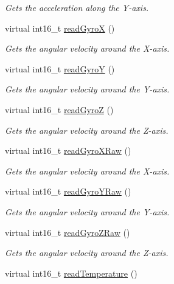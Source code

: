 \begin{DoxyCompactItemize}
\begin{DoxyCompactList}\small\item\em Gets the acceleration along the Y-\/axis. \end{DoxyCompactList}\item 
virtual int16\+\_\+t \hyperlink{classMpu6050_a9ec9443071ff4c69d08aa5aada80a1ad}{read\+GyroX} ()
\begin{DoxyCompactList}\small\item\em Gets the angular velocity around the X-\/axis. \end{DoxyCompactList}\item 
virtual int16\+\_\+t \hyperlink{classMpu6050_a32291036eb3c88455bc8054d5014d99c}{read\+GyroY} ()
\begin{DoxyCompactList}\small\item\em Gets the angular velocity around the Y-\/axis. \end{DoxyCompactList}\item 
virtual int16\+\_\+t \hyperlink{classMpu6050_ad9259b8dcbdf7f8e1473fc4b0d9273e4}{read\+GyroZ} ()
\begin{DoxyCompactList}\small\item\em Gets the angular velocity around the Z-\/axis. \end{DoxyCompactList}\item 
virtual int16\+\_\+t \hyperlink{classMpu6050_a8047b6ee1c7e151664e5d8bc94dd3c11}{read\+Gyro\+X\+Raw} ()
\begin{DoxyCompactList}\small\item\em Gets the angular velocity around the X-\/axis. \end{DoxyCompactList}\item 
virtual int16\+\_\+t \hyperlink{classMpu6050_a080b7bea5ae0c8e839ee763aabb8a31c}{read\+Gyro\+Y\+Raw} ()
\begin{DoxyCompactList}\small\item\em Gets the angular velocity around the Y-\/axis. \end{DoxyCompactList}\item 
virtual int16\+\_\+t \hyperlink{classMpu6050_a8cf0adb003855acc603230f6fd2e3887}{read\+Gyro\+Z\+Raw} ()
\begin{DoxyCompactList}\small\item\em Gets the angular velocity around the Z-\/axis. \end{DoxyCompactList}\item 
virtual int16\+\_\+t \hyperlink{classMpu6050_ad34c38e7656bfab491ebc1a9f8b21a6b}{read\+Temperature} ()

\end{DoxyCompactItemize}
